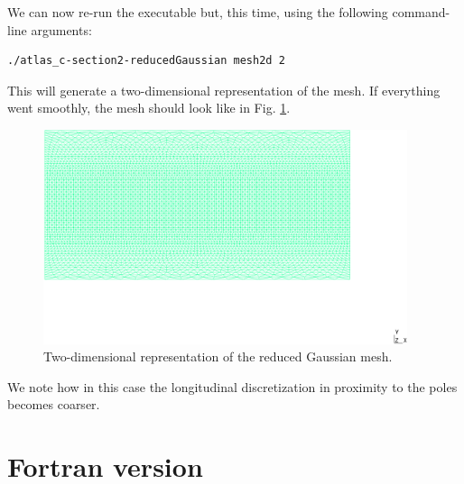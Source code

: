 %
We can now re-run the executable but, this time, using the following
command-line arguments:
%
\begin{lstlisting}[style=BashStyle]
./atlas_c-section2-reducedGaussian mesh2d 2
\end{lstlisting}
% 
This will generate a two-dimensional representation of the mesh.
If everything went smoothly, the mesh should look like in Fig. 
\ref{fig:section2-reducedGaussian-2d}.
%
\begin{figure}[H]
  \centering
    \includegraphics[width=0.95\textwidth]{imgs/reducedGaussian_2d}
    \caption{Two-dimensional representation of the reduced Gaussian mesh.}
    \label{fig:section2-reducedGaussian-2d}
\end{figure}
%
We note how in this case the longitudinal discretization in proximity 
to the poles becomes coarser.
 



\section{Fortran version}